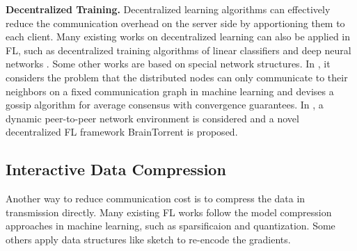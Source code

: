 \documentclass[11pt]{article}
\newcommand{\fakeparagraph}[1]{\vspace{1mm}\noindent\textbf{#1.}}
\begin{document}
\fakeparagraph{Decentralized Training}
Decentralized learning algorithms can effectively reduce the communication overhead on the server side by apportioning them to each client.
Many existing works on decentralized learning can also be applied in FL, such as 
decentralized training algorithms of linear classifiers \cite{DBLP:conf/nips/HeBJ18} and deep neural networks \cite{DBLP:conf/pkdd/KampASHSWW18}.
Some other works are based on special network structures.
In \cite{DBLP:conf/icml/KoloskovaSJ19}, it considers the problem that the distributed nodes can only communicate to their neighbors on a fixed communication graph in machine learning and devises a gossip algorithm for average consensus with convergence guarantees.
In \cite{DBLP:journals/corr/abs-1905-06731}, a dynamic peer-to-peer network environment is considered and a novel decentralized FL framework BrainTorrent is proposed. 

\subsection{Interactive Data Compression}

Another way to reduce communication cost is to compress the data in transmission directly.
Many existing FL works follow the model compression approaches in machine learning, such as sparsificaion and quantization.
Some others apply data structures like sketch to re-encode the gradients.
\end{document}
